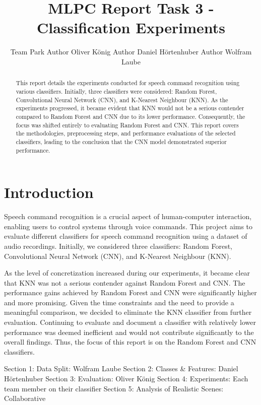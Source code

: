 \documentclass{article}
\title{MLPC Report Task 3 - Classification Experiments}
\author{%
  Team Park \And
  Author Oliver König \And
  Author Daniel Hörtenhuber \And
  Author Wolfram Laube
}
\begin{document}
\maketitle

\begin{abstract}
This report details the experiments conducted for speech command recognition using various classifiers. Initially, three classifiers were considered: Random Forest, Convolutional Neural Network (CNN), and K-Nearest Neighbour (KNN). As the experiments progressed, it became evident that KNN would not be a serious contender compared to Random Forest and CNN due to its lower performance. Consequently, the focus was shifted entirely to evaluating Random Forest and CNN. This report covers the methodologies, preprocessing steps, and performance evaluations of the selected classifiers, leading to the conclusion that the CNN model demonstrated superior performance.
\end{abstract}

\section{Introduction}
Speech command recognition is a crucial aspect of human-computer interaction, enabling users to control systems through voice commands. This project aims to evaluate different classifiers for speech command recognition using a dataset of audio recordings. Initially, we considered three classifiers: Random Forest, Convolutional Neural Network (CNN), and K-Nearest Neighbour (KNN).

As the level of concretization increased during our experiments, it became clear that KNN was not a serious contender against Random Forest and CNN. The performance gains achieved by Random Forest and CNN were significantly higher and more promising. Given the time constraints and the need to provide a meaningful comparison, we decided to eliminate the KNN classifier from further evaluation. Continuing to evaluate and document a classifier with relatively lower performance was deemed inefficient and would not contribute significantly to the overall findings. Thus, the focus of this report is on the Random Forest and CNN classifiers.

\begin{contributions}
  Section 1: Data Split: Wolfram Laube \AND
  Section 2: Classes & Features: Daniel Hörtenhuber \AND
  Section 3: Evaluation: Oliver König \AND
  Section 4: Experiments: Each team member on their classifier \AND
  Section 5: Analysis of Realistic Scenes: Collaborative
\end{contributions}







\end{document}
